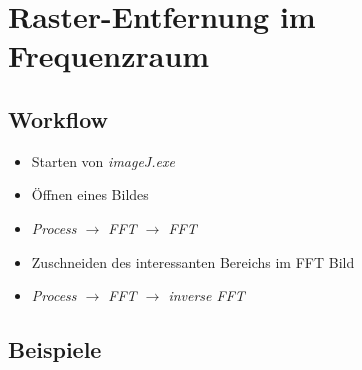 \documentclass[12pt,german]{article}
\begin{document}
\section{ Raster-Entfernung im Frequenzraum}
\subsection{Workflow}
\begin{itemize}
	\item Starten von \textit{imageJ.exe}
	\item Öffnen eines Bildes
	\item \textit{Process $\rightarrow$ FFT $\rightarrow$ FFT}
	\item Zuschneiden des interessanten Bereichs im FFT Bild
	\item \textit{Process $\rightarrow$ FFT $\rightarrow$ inverse FFT}
\end{itemize}

\subsection{Beispiele}
\end{document}
